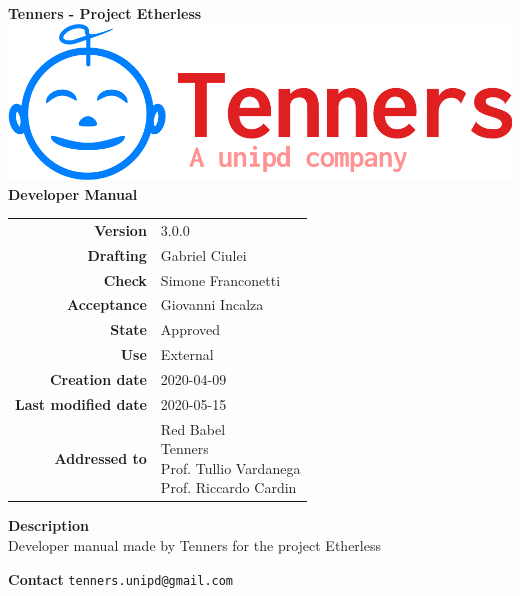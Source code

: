 \begin{titlepage}
	\begin{center}
		\large \textbf{Tenners - Project Etherless}
		\vfill
		\includegraphics[scale = 0.3]{./res/img/logo.png}\\
		\vfill
		\Huge \textbf{Developer Manual}

        \vfill
        \large

        \begin{tabular}{r|l}
                        \textbf{Version} & 3.0.0 \\
                        \textbf{Drafting} &
						Gabriel Ciulei\\
                        \textbf{Check} &
                        Simone Franconetti\\
                        \textbf{Acceptance} &
                        Giovanni Incalza\\
                        \textbf{State} & Approved \\
                        \textbf{Use} & External\\
                        \textbf{Creation date} &  2020-04-09\\
                        \textbf{Last modified date} &  2020-05-15\\
                        \textbf{Addressed to} & \parbox[t]{5cm}{Red Babel \\Tenners \\Prof. Tullio Vardanega \\Prof. Riccardo Cardin
                        							}
                \end{tabular}
                \vfill
                \normalsize
                \vfill
                                \textbf{Description}
                \\Developer manual made by Tenners for the project Etherless
                \vfill
                \normalsize
                \vfill
                
                \textbf{Contact}
                \texttt{tenners.unipd@gmail.com}

	\end{center}
\end{titlepage}
